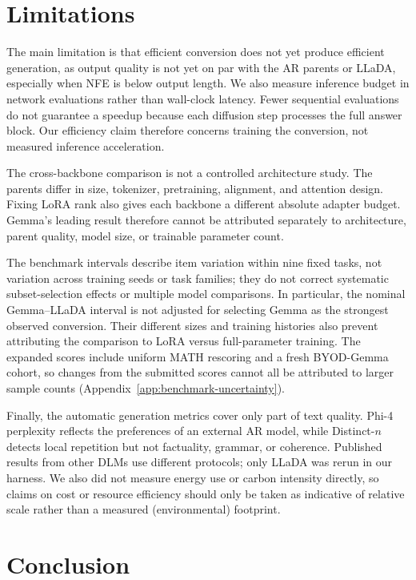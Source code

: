 \documentclass{article}
\begin{document}
\section{Limitations}
The main limitation is that efficient conversion does not yet produce efficient generation, as output quality is not yet on par with the AR parents or LLaDA, especially when NFE is below output length. We also measure inference budget in network evaluations rather than wall-clock latency. Fewer sequential evaluations do not guarantee a speedup because each diffusion step processes the full answer block. Our efficiency claim therefore concerns training the conversion, not measured inference acceleration.

The cross-backbone comparison is not a controlled architecture study. The parents differ in size, tokenizer, pretraining, alignment, and attention design. Fixing LoRA rank also gives each backbone a different absolute adapter budget. Gemma's leading result therefore cannot be attributed separately to architecture, parent quality, model size, or trainable parameter count.

The benchmark intervals describe item variation within nine fixed tasks, not variation across training seeds or task families; they do not correct systematic subset-selection effects or multiple model comparisons. In particular, the nominal Gemma--LLaDA interval is not adjusted for selecting Gemma as the strongest observed conversion. Their different sizes and training histories also prevent attributing the comparison to LoRA versus full-parameter training. The expanded scores include uniform MATH rescoring and a fresh BYOD-Gemma cohort, so changes from the submitted scores cannot all be attributed to larger sample counts (Appendix~\ref{app:benchmark-uncertainty}).

Finally, the automatic generation metrics cover only part of text quality. Phi-4 perplexity reflects the preferences of an external AR model, while Distinct-$n$ detects local repetition but not factuality, grammar, or coherence. Published results from other DLMs use different protocols; only LLaDA was rerun in our harness. We also did not measure energy use or carbon intensity directly, so claims on cost or resource efficiency should only be taken as indicative of relative scale rather than a measured (environmental) footprint.

\section{Conclusion}
\end{document}

